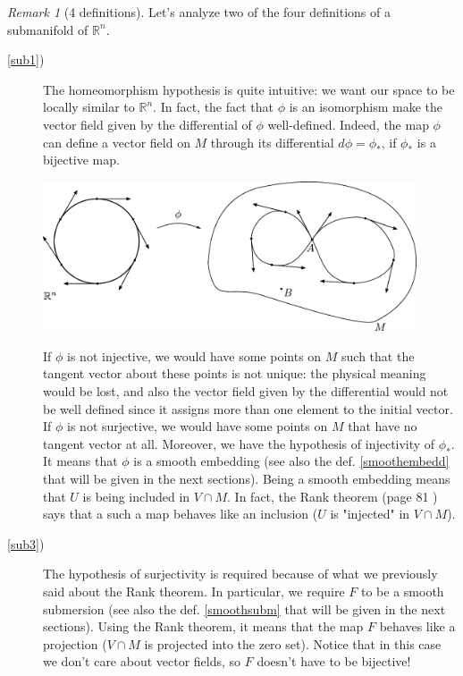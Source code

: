 \documentclass[a4paper,11pt,titlepage, article, oneside]{memoir}
\numberwithin{equation}{section}
\theoremstyle{definition}
\theoremstyle{remark}
\newtheorem{remark}[theorem]{Remark}
\newcommand{\rfield}{\mathbb{R}}
\begin{document}
\begin{remarkbox}\begin{remark}[4 definitions]
Let's analyze two of the four definitions of a submanifold of $\rfield^n$.
\begin{description}
\item[\ref{sub1})] The homeomorphism hypothesis is quite intuitive: we want our space to be locally similar to $\rfield^n$. In fact, the fact that $\phi$ is an isomorphism make the vector field given by the differential of $\phi$ well-defined. Indeed, the map $\phi$ can define a vector field on $M$ through its differential $d\phi=\phi_*$, if $\phi_*$ is a bijective map.
\begin{center}
\begin{minipage}{0.9\textwidth}
\vspace{1em}
     \centering
     \includegraphics[width=0.9\textwidth]{Images/notinjnotsurj.pdf} \label{Fig:notinjnotsurj}
     \vspace{1em}
\end{minipage}
\end{center}
If $\phi$ is not injective, we would have some points on $M$ such that the tangent vector about these points is not unique: the physical meaning would be lost, and also the vector field given by the differential would not be well defined since it assigns more than one element to the initial vector.
If $\phi$ is not surjective, we would have some points on $M$ that have no tangent vector at all.
Moreover, we have the hypothesis of injectivity of $\phi_*$. It means that $\phi$ is a smooth embedding (see also the def. \ref{smoothembedd} that will be given in the next sections). Being a smooth embedding means that $U$ is being included in $V \cap M$. In fact, the Rank theorem (page 81 ) says that a such a map behaves like an inclusion ($U$ is "injected" in $V \cap M$).
\item[\ref{sub3})] The hypothesis of surjectivity is required because of what we previously said about the Rank theorem. In particular, we require $F$ to be a smooth submersion (see also the def. \ref{smoothsubm} that will be given in the next sections). Using the Rank theorem, it means that the map $F$ behaves like a projection ($V \cap M$ is projected into the zero set). Notice that in this case we don't care about vector fields, so $F$ doesn't have to be bijective!
\end{description}
\end{remark}\end{remarkbox}
\end{document}
